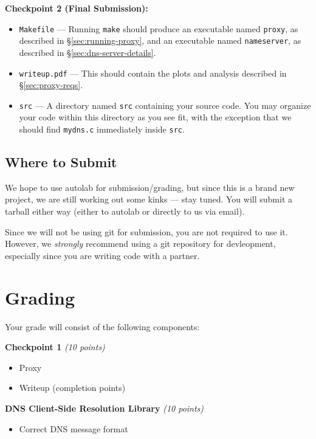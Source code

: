 \documentclass{article}
\begin{document}
\medskip \noindent \textbf{Checkpoint 2 (Final Submission):}
\begin{itemize}
	\item \texttt{Makefile} --- Running \texttt{make} should produce an
	executable named \texttt{proxy}, as described in \S\ref{sec:running-proxy},
	and an executable named \texttt{nameserver}, as described in
	\S\ref{sec:dns-server-details}.

	\item \texttt{writeup.pdf} --- This should contain the plots and analysis
	described in \S\ref{sec:proxy-reqs}. 

	\item \texttt{src} --- A directory named \texttt{src} containing your
	source code. You may organize your code within this directory as you see
	fit, with the exception that we should find \texttt{mydns.c} immediately
	inside \texttt{src}.
\end{itemize}


\subsection{Where to Submit}

We hope to use autolab for submission/grading, but since this is a brand new
project, we are still working out some kinks --- stay tuned. You will submit a
tarball either way (either to autolab or directly to us via email).

Since we will not be using git for submission, you are not required to use it.
However, we \emph{strongly} recommend using a git repository for devleopment,
especially since you are writing code with a partner.


\section{Grading}

Your grade will consist of the following components:

\smallskip \noindent \textbf{Checkpoint 1} \textit{(10 points)}
\begin{itemize}
	\item Proxy
	\item Writeup (completion points)
\end{itemize}

\smallskip \noindent \textbf{DNS Client-Side Resolution Library} \textit{(10 points)}
\begin{itemize}
	\item Correct DNS message format
\end{itemize}
\end{document}
